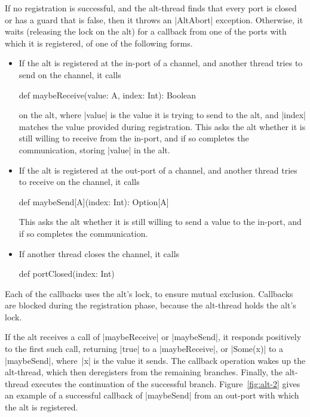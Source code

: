 If no registration is successful, and the alt-thread finds that every port is
closed or has a guard that is false, then it throws an |AltAbort| exception.
Otherwise, it waits (releasing the lock on the alt) for a callback from one of
the ports with which it is registered, of one of the following forms.
%
\begin{itemize}
\item If the alt is registered at the in-port of a channel, and another thread
  tries to send on the channel, it calls
\begin{scala}
def maybeReceive(value: A, index: Int): Boolean
\end{scala}
%
on the alt, where |value| is the value it is trying to send to the alt, and
|index| matches the value provided during registration.  This asks
the alt whether it is still willing to receive from the in-port, and if so
completes the communication, storing |value| in the alt. 

\item If the alt is registered at the out-port of a channel, and another thread
  tries to receive on the channel, it calls
%
\begin{scala}
def maybeSend[A](index: Int): Option[A]
\end{scala}
%
This asks the alt whether it is still willing to send a value to the in-port,
and if so completes the communication.

\item If another thread closes the channel, it calls 
%
\begin{scala}
def portClosed(index: Int)
\end{scala}
\end{itemize}
%
Each of the callbacks uses the alt's lock, to ensure mutual exclusion. 
Callbacks are blocked during the registration phase, because the alt-thread
holds the alt's lock.  

If the alt receives a call of |maybeReceive| or |maybeSend|, it responds
positively to the first such call, returning |true| to a |maybeReceive|, or
|Some(x)| to a |maybeSend|, where~|x| is the value it sends.
The  callback operation wakes up the alt-thread, which then
deregisters from the remaining branches.
%
Finally, the alt-thread
executes the continuation of the successful branch.
%
Figure~\ref{fig:alt-2} gives an example of a successful callback of
|maybeSend| from an out-port with which the alt is registered.

